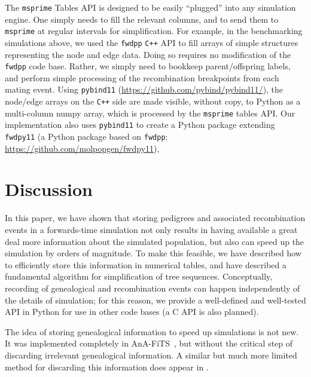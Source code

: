 \documentclass{article}
\newcommand{\fwdpp}{\texttt{fwdpp}}
\newcommand{\cpp}{\texttt{C++}}
\newcommand{\msprime}{\texttt{msprime}}
\begin{document}
The \msprime{} Tables API is designed to be easily ``plugged'' into any simulation engine.
One simply needs to fill the relevant columns,
and to send them to \msprime{} at regular intervals for simplification.
For example, in the benchmarking simulations above,
we used the \fwdpp{} \cpp{} API \citep{fwdpp}
to fill arrays of simple structures representing the node and edge data.
Doing so requires no modification of the \fwdpp{} code base.
Rather, we simply need to bookkeep parent/offspring labels,
and perform simple processing of the recombination breakpoints from each mating event.
Using \texttt{pybind11} (\url{https://github.com/pybind/pybind11/}),
the node/edge arrays on the \cpp{} side are made visible, without copy, to Python as a multi-column numpy array,
which is processed by the \msprime{} tables API.
Our implementation also uses \texttt{pybind11}
to create a Python package extending \texttt{fwdpy11}
(a Python package based on \fwdpp{}; \url{https://github.com/molpopgen/fwdpy11}),



\section*{Discussion}

In this paper, we have shown that storing pedigrees
and associated recombination events
in a forwards-time simulation
not only results in having available a great deal more information about the simulated population,
but also can speed up the simulation by orders of magnitude.
To make this feasible,
we have described how to efficiently store this information in numerical tables,
and have described a fundamental algorithm for simplification of tree sequences.
Conceptually, recording of genealogical and recombination events
can happen independently of the details of simulation;
for this reason, we provide a well-defined and well-tested API in Python
for use in other code bases (a C API is also planned).

The idea of storing genealogical information to speed up simulations is not new.
It was implemented completely in AnA-FiTS~\citep{aberer2013rapid},
but without the critical step of discarding irrelevant genealogical information.
A similar but much more limited method for
discarding this information does appear in \citet{padhukasahasram2008exploring}.
\end{document}
